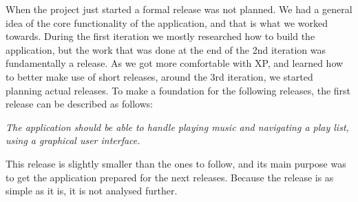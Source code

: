When the project just started a formal release was not planned. We had a general idea of the core functionality of the application, and that is what we worked towards. During the first iteration we mostly researched how to build the application, but the work that was done at the end of the 2nd iteration was fundamentally a release. As we got more comfortable with XP, and learned how to better make use of short releases, around the 3rd iteration, we started planning actual releases. To make a foundation for the following releases, the first release can be described as follows:

\textit{The application should be able to handle playing music and navigating a play list, using a graphical user interface.}

This release is slightly smaller than the ones to follow, and its main purpose was to get the application prepared for the next releases. Because the release is as simple as it is, it is not analysed further.